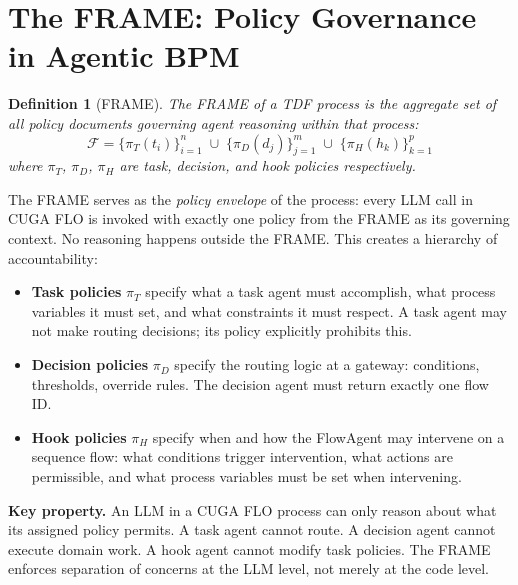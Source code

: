 \documentclass[11pt,a4paper]{article}
\newtheorem{definition}{Definition}
\begin{document}
\section{The FRAME: Policy Governance in Agentic BPM}
\label{sec:frame}

\begin{definition}[FRAME]
The \emph{FRAME} of a TDF process is the aggregate set of all policy documents
governing agent reasoning within that process:
\[
  \mathcal{F} = \bigl\{\pi_T(t_i)\bigr\}_{i=1}^n \;\cup\;
                \bigl\{\pi_D(d_j)\bigr\}_{j=1}^m \;\cup\;
                \bigl\{\pi_H(h_k)\bigr\}_{k=1}^p
\]
where $\pi_T$, $\pi_D$, $\pi_H$ are task, decision, and hook policies
respectively.
\end{definition}

The FRAME serves as the \emph{policy envelope} of the process: every LLM call
in CUGA FLO is invoked with exactly one policy from the FRAME as its governing
context. No reasoning happens outside the FRAME. This creates a hierarchy of
accountability:

\begin{itemize}[noitemsep]
  \item \textbf{Task policies} $\pi_T$ specify what a task agent must accomplish,
        what process variables it must set, and what constraints it must respect.
        A task agent may not make routing decisions; its policy explicitly prohibits
        this.
  \item \textbf{Decision policies} $\pi_D$ specify the routing logic at a gateway:
        conditions, thresholds, override rules. The decision agent must return
        exactly one flow ID.
  \item \textbf{Hook policies} $\pi_H$ specify when and how the FlowAgent may
        intervene on a sequence flow: what conditions trigger intervention, what
        actions are permissible, and what process variables must be set when
        intervening.
\end{itemize}

\begin{tealframe}
\textbf{Key property.} An LLM in a CUGA FLO process can only reason about what
its assigned policy permits. A task agent cannot route. A decision agent cannot
execute domain work. A hook agent cannot modify task policies. The FRAME enforces
separation of concerns at the LLM level, not merely at the code level.
\end{tealframe}
\end{document}
